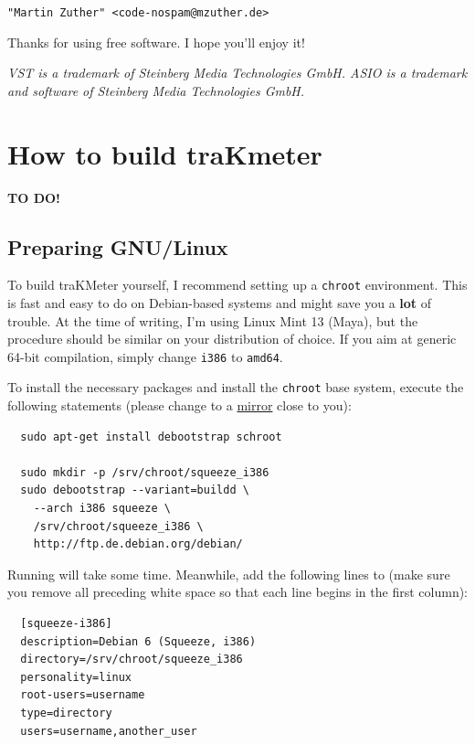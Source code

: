 \begin{center}
  \texttt{"Martin Zuther" <code-nospam@mzuther.de>}
\end{center}

Thanks for using free software.  I hope you'll enjoy it!

\emph{VST is a trademark of Steinberg Media Technologies GmbH.  ASIO
  is a trademark and software of Steinberg Media Technologies GmbH.}

\appendix

\chapter{How to build traKmeter}
\label{chap:build_trakmeter}

\textbf{TO DO!}

\section{Preparing GNU/Linux}

To build traKMeter yourself, I recommend setting up a \texttt{chroot}
environment.  This is fast and easy to do on Debian-based systems and
might save you a \textbf{lot} of trouble.  At the time of writing, I'm
using Linux Mint 13 (Maya), but the procedure should be similar on
your distribution of choice.  If you aim at generic \num{64}-bit
compilation, simply change \texttt{i386} to \texttt{amd64}.

To install the necessary packages and install the \texttt{chroot} base
system, execute the following statements (please change
 to a
\href{http://www.debian.org/mirror/list}{mirror} close to you):

\begin{verbatim}
  sudo apt-get install debootstrap schroot

  sudo mkdir -p /srv/chroot/squeeze_i386
  sudo debootstrap --variant=buildd \
    --arch i386 squeeze \
    /srv/chroot/squeeze_i386 \
    http://ftp.de.debian.org/debian/
\end{verbatim}

Running  will take some time.  Meanwhile, add the
following lines to  (make sure you
remove all preceding white space so that each line begins in the first
column):

\begin{verbatim}
  [squeeze-i386]
  description=Debian 6 (Squeeze, i386)
  directory=/srv/chroot/squeeze_i386
  personality=linux
  root-users=username
  type=directory
  users=username,another_user
\end{verbatim}

